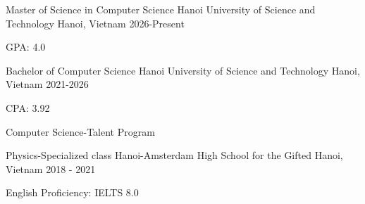 

\begin{cventries}

    \cventry
      {Master of Science in Computer Science} %
      {Hanoi University of Science and Technology} %
      {Hanoi, Vietnam} %
      {2026-Present} %
      {
        \begin{cvitems}
          \item {GPA: 4.0}
        \end{cvitems}
      }
  \cventry
    {Bachelor of Computer Science} %
    {Hanoi University of Science and Technology} %
    {Hanoi, Vietnam} %
    {2021-2026} %
    {
      \begin{cvitems} %
        \item {CPA: 3.92}
        \item {Computer Science-Talent Program}
      \end{cvitems}
    }
    
  \cventry
    {Physics-Specialized class} %
    {Hanoi-Amsterdam High School for the Gifted} %
    {Hanoi, Vietnam} %
    {2018 - 2021} %
    {
      \begin{cvitems} %
        \item {English Proficiency: IELTS 8.0}
      \end{cvitems}
    }

\end{cventries}
